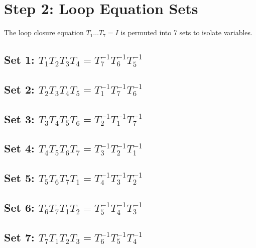 \section{Step 2: Loop Equation Sets}
The loop closure equation $T_1 \dots T_7 = I$ is permuted into 7 sets to isolate variables.
\subsection*{Set 1: $T_{1}T_{2}T_{3}T_{4} = T_{7}^{-1}T_{6}^{-1}T_{5}^{-1}$}
\subsection*{Set 2: $T_{2}T_{3}T_{4}T_{5} = T_{1}^{-1}T_{7}^{-1}T_{6}^{-1}$}
\subsection*{Set 3: $T_{3}T_{4}T_{5}T_{6} = T_{2}^{-1}T_{1}^{-1}T_{7}^{-1}$}
\subsection*{Set 4: $T_{4}T_{5}T_{6}T_{7} = T_{3}^{-1}T_{2}^{-1}T_{1}^{-1}$}
\subsection*{Set 5: $T_{5}T_{6}T_{7}T_{1} = T_{4}^{-1}T_{3}^{-1}T_{2}^{-1}$}
\subsection*{Set 6: $T_{6}T_{7}T_{1}T_{2} = T_{5}^{-1}T_{4}^{-1}T_{3}^{-1}$}
\subsection*{Set 7: $T_{7}T_{1}T_{2}T_{3} = T_{6}^{-1}T_{5}^{-1}T_{4}^{-1}$}
\newpage
